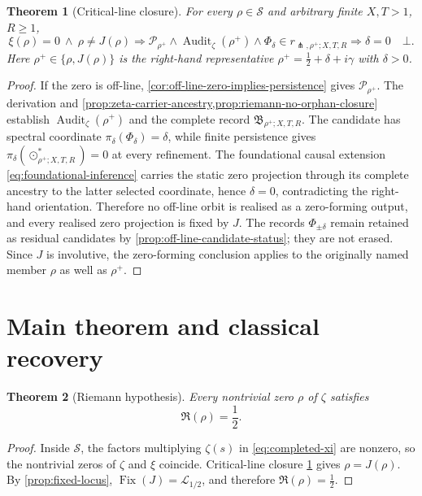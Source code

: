 \documentclass[11pt,a4paper]{article}
\newtheorem{theorem}{Theorem}[section]
\theoremstyle{definition}
\newcommand{\CriticalLine}{\mathcal{L}_{1/2}}
\newcommand{\CriticalStrip}{\mathcal{S}}
\newcommand{\Dual}{J}
\DeclareMathOperator{\Fix}{Fix}
\DeclareMathOperator{\Audit}{Audit}
\begin{document}
\begin{theorem}[Critical-line closure]
\label{thm:critical-line-closure}
For every $\rho\in\CriticalStrip$ and arbitrary finite $X,T>1$, $R\geq1$,
\begin{equation}
\label{eq:required-local-implication}
  \xi(\rho)=0\ \land\ \rho\neq\Dual(\rho)
  \Longrightarrow
  \mathcal P_{\rho^+}
  \land\Audit_\zeta(\rho^+)
  \land\Phi_\delta\in r_{\pitchfork,\rho^+;X,T,R}
  \Longrightarrow
  \delta=0
  \quad\bot.
\end{equation}
Here $\rho^+\in\{\rho,\Dual(\rho)\}$ is the right-hand representative
$\rho^+=\tfrac12+\delta+i\gamma$ with $\delta>0$.
\end{theorem}

\begin{proof}
If the zero is off-line, \cref{cor:off-line-zero-implies-persistence} gives
$\mathcal P_{\rho^+}$. The derivation and
\cref{prop:zeta-carrier-ancestry,prop:riemann-no-orphan-closure} establish
$\Audit_\zeta(\rho^+)$ and the complete record
$\mathfrak B_{\rho^+;X,T,R}$. The candidate has spectral coordinate
$\pi_\delta(\Phi_\delta)=\delta$, while finite persistence gives
$\pi_\delta(\odot_{\rho^+;X,T,R}^\ast)=0$ at every refinement. The foundational
causal extension \cref{eq:foundational-inference} carries the static zero
projection through its complete ancestry to the latter selected coordinate,
hence $\delta=0$, contradicting the right-hand orientation. Therefore no
off-line orbit is realised as a zero-forming output, and every realised zero
projection is fixed by $\Dual$. The records $\Phi_{\pm\delta}$ remain retained
as residual candidates by \cref{prop:off-line-candidate-status}; they are not
erased. Since $\Dual$ is involutive, the zero-forming conclusion applies to
the originally named member $\rho$ as well as $\rho^+$.
\end{proof}

\section{Main theorem and classical recovery}
\label{sec:classical-recovery}

\begin{theorem}[Riemann hypothesis]
\label{thm:riemann-hypothesis}
Every nontrivial zero $\rho$ of $\zeta$ satisfies
\[
  \Re(\rho)=\frac12.
\]
\end{theorem}

\begin{proof}
Inside $\CriticalStrip$, the factors multiplying $\zeta(s)$ in
\cref{eq:completed-xi} are nonzero, so the nontrivial zeros of $\zeta$ and
$\xi$ coincide. Critical-line closure
\cref{thm:critical-line-closure} gives $\rho=\Dual(\rho)$. By
\cref{prop:fixed-locus}, $\Fix(\Dual)=\CriticalLine$, and therefore
$\Re(\rho)=\tfrac12$.
\end{proof}
\end{document}

